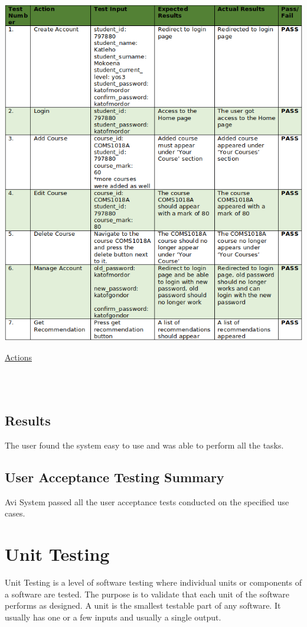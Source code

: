 \documentclass[10pt]{article}
\begin{document}
\begin{center}
\includegraphics[width=.9\textwidth]{tester.png}
\end{center}
\caption{\underline{Actions}} \\ \\

\subsection{Results}

The user found the system easy to use and was able to perform all the tasks.

\subsection{User Acceptance Testing Summary}

Avi System passed all the user acceptance tests conducted on the specified use cases. 


\section{Unit Testing}

Unit Testing is a level of software testing where individual units or components of a software are tested. The purpose is to validate that each unit of the software performs as designed. A unit is the smallest testable part of any software. It usually has one or a few inputs and usually a single output.
\end{document}
